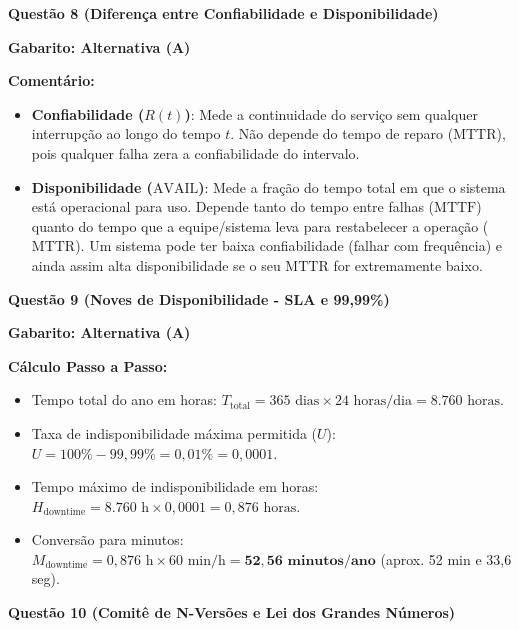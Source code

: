 \documentclass[12pt,a4paper]{article}
\begin{document}
\textbf{Questão 8 (Diferença entre Confiabilidade e Disponibilidade)}

\textbf{Gabarito: Alternativa (A)}

\textbf{Comentário:} 
\begin{itemize}
    \item \textbf{Confiabilidade ($R(t)$)}: Mede a continuidade do serviço sem qualquer interrupção ao longo do tempo $t$. Não depende do tempo de reparo ($\text{MTTR}$), pois qualquer falha zera a confiabilidade do intervalo.
    \item \textbf{Disponibilidade ($\text{AVAIL}$)}: Mede a fração do tempo total em que o sistema está operacional para uso. Depende tanto do tempo entre falhas ($\text{MTTF}$) quanto do tempo que a equipe/sistema leva para restabelecer a operação ($\text{MTTR}$). Um sistema pode ter baixa confiabilidade (falhar com frequência) e ainda assim alta disponibilidade se o seu $\text{MTTR}$ for extremamente baixo.
\end{itemize}

\vspace{0.5cm}

\textbf{Questão 9 (Noves de Disponibilidade - SLA e 99,99\%)}

\textbf{Gabarito: Alternativa (A)}

\textbf{Cálculo Passo a Passo:}
\begin{itemize}
    \item Tempo total do ano em horas: $T_{\text{total}} = 365\text{ dias} \times 24\text{ horas/dia} = 8.760\text{ horas}$.
    \item Taxa de indisponibilidade máxima permitida ($U$): $U = 100\% - 99,99\% = 0,01\% = 0,0001$.
    \item Tempo máximo de indisponibilidade em horas: $H_{\text{downtime}} = 8.760\text{ h} \times 0,0001 = 0,876\text{ horas}$.
    \item Conversão para minutos: $M_{\text{downtime}} = 0,876\text{ h} \times 60\text{ min/h} = \mathbf{52,56\text{ minutos/ano}}$ (aprox. 52 min e 33,6 seg).
\end{itemize}

\vspace{0.5cm}

\textbf{Questão 10 (Comitê de N-Versões e Lei dos Grandes Números)}
\end{document}
